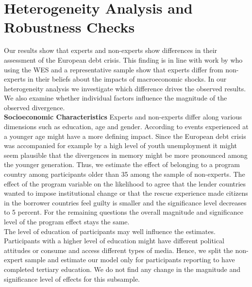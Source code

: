 \documentclass[12pt]{article}
\begin{document}
\section{Heterogeneity Analysis and Robustness Checks}
Our results show that experts and non-experts show differences in their assessment of the European debt crisis. This finding is in line with work by \cite{roth} who using the WES and a representative sample show that experts differ from non-experts in their beliefs about the impacts of macroeconomic shocks. In our heterogeneity analysis we investigate which difference drives the observed results. We also examine whether individual factors influence the magnitude of the observed divergence. 
\\



\textbf{Socioeconomic Characteristics}
 Experts and non-experts differ along various dimensions such as education, age and gender.
 According to \cite{baumeister} events experienced at a younger age might have a more defining impact. Since the European debt crisis was accompanied for example by a high level of youth unemployment it might seem plausible that the divergences in memory might be more pronounced among the younger generation. Thus, we estimate the effect of belonging to a program country among participants older than 35 among the sample of non-experts.  The effect of the program variable on the likelihood to agree that the lender countries wanted to impose institutional change or that the rescue experience made citizens in the borrower countries feel guilty is smaller and the significance level decreases to 5 percent. For the remaining questions the overall magnitude and significance level of the program effect stays the same. 
\\
The level of education of participants may well influence the estimates. Participants with a higher level of education might have different political attitudes or consume and access different types of media. Hence, we split the non-expert sample and estimate our model only for participants reporting to have completed tertiary education. We do not find any change in the magnitude and significance level of effects for this subsample. 
\\
\end{document}
